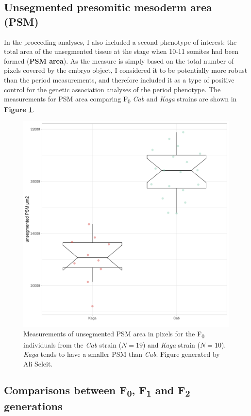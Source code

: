 \documentclass[
]{book}
\begin{document}
\clearpage

\hypertarget{unsegmented-presomitic-mesoderm-area-psm}{%
\subsection{Unsegmented presomitic mesoderm area (PSM)}\label{unsegmented-presomitic-mesoderm-area-psm}}

In the proceeding analyses, I also included a second phenotype of interest: the total area of the unsegmented tissue at the stage when 10-11 somites had been formed (\textbf{PSM area}). As the measure is simply based on the total number of pixels covered by the embryo object, I considered it to be potentially more robust than the period measurements, and therefore included it as a type of positive control for the genetic association analyses of the period phenotype. The measurements for PSM area comparing F\textsubscript{0} \emph{Cab} and \emph{Kaga} strains are shown in \textbf{Figure \ref{fig:ali-psm-F0}}.



\begin{figure}

{\centering \includegraphics[width=0.6\linewidth]{figs/somites/ali_PSM_Cab_Kaga} 

}

\caption{Measurements of unsegmented PSM area in pixels for the F\textsubscript{0} individuals from the \emph{Cab} strain (\(N = 19\)) and \emph{Kaga} strain (\(N = 10\)). \emph{Kaga} tends to have a smaller PSM than \emph{Cab}. Figure generated by Ali Seleit.}\label{fig:ali-psm-F0}
\end{figure}

\clearpage

\hypertarget{comparisons-between-f0-f1-and-f2-generations}{%
\subsection{\texorpdfstring{Comparisons between F\textsubscript{0}, F\textsubscript{1} and F\textsubscript{2} generations}{Comparisons between F0, F1 and F2 generations}}\label{comparisons-between-f0-f1-and-f2-generations}}
\end{document}
